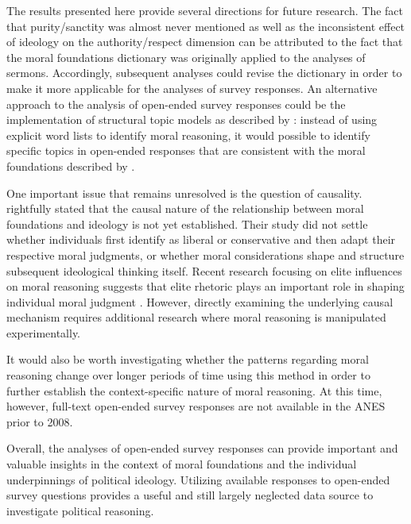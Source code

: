 \documentclass[12pt]{article}
\begin{document}
The results presented here provide several directions for future research. The fact that purity/sanctity was almost never mentioned as well as the inconsistent effect of ideology on the authority/respect dimension can be attributed to the fact that the moral foundations dictionary was originally applied to the analyses of sermons. Accordingly, subsequent analyses could revise the dictionary in order to make it more applicable for the analyses of survey responses. An alternative approach to the analysis of open-ended survey responses could be the implementation of structural topic models as described by \citet{roberts2014structural}: instead of using explicit word lists to identify moral reasoning, it would possible to identify specific topics in open-ended responses that are consistent with the moral foundations described by \citet[see also \citealt{lin2008joint}]{haidt2008moral}.

One important issue that remains unresolved is the question of causality. \citet{graham2009liberals} rightfully stated that the causal nature of the relationship between moral foundations and ideology is not yet established. Their study did not settle whether individuals first identify as liberal or conservative and then adapt their respective moral judgments, or whether moral considerations shape and structure subsequent ideological thinking itself. Recent research focusing on elite influences on moral reasoning suggests that elite rhetoric plays an important role in shaping individual moral judgment \citep[see for example][]{clifford2013words,clifford2015concerns}. However, directly examining the underlying causal mechanism requires additional research where moral reasoning is manipulated experimentally.

It would also be worth investigating whether the patterns regarding moral reasoning change over longer periods of time using this method in order to further establish the context-specific nature of moral reasoning. At this time, however, full-text open-ended survey responses are not available in the ANES prior to 2008.

Overall, the analyses of open-ended survey responses can provide important and valuable insights in the context of moral foundations and the individual underpinnings of political ideology. Utilizing available responses to open-ended survey questions provides a useful and still largely neglected data source to investigate political reasoning.

\end{document}
